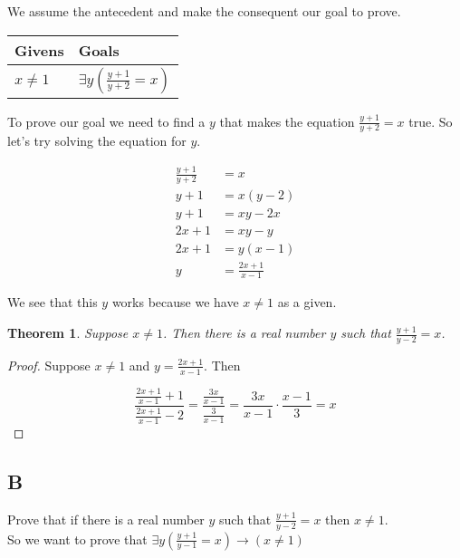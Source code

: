 \documentclass{article}
\newcommand{\n}{ \noindent }
\newtheorem*{theorem}{Theorem}  %
\begin{document}
We assume the antecedent and make the consequent our goal to prove. \\

\begin{table}[h]
\begin{tabular}{ll}
\hline
Givens & Goals   \\ \hline
$x \neq 1$ & $\exists y \left( \tfrac{y+1}{y+2} = x \right)$   \\ \hline
\end{tabular}
\end{table}

\n To prove our goal we need to find  a $y$ that makes the equation $ \tfrac{y+1}{y+2} = x $ true. So let's try solving the equation for $y$.

\begin{align*}
\frac{y+1}{y+2} &= x \\
y+1 &= x(y-2) \\
y+1 &= xy - 2x \\
2x+1 &= xy-y \\
2x+1 &= y(x-1) \\
y &= \frac{2x+1}{x-1}
\end{align*}

We see that this $y$ works because we have $x \neq 1$ as a given.

\begin{theorem} Suppose $x \neq 1$. Then there is a real number $y$ such that $\tfrac{y+1}{y-2} = x$.
\end{theorem}
\begin{proof}
Suppose $x \neq 1$ and $y = \tfrac{2x+1}{x-1}$. Then

\begin{equation*}
\frac{ \frac{2x+1}{x-1} +1 }{ \frac{2x+1}{x-1} -2} = \frac{ \frac{3x}{x-1} } { \frac{3}{x-1} } = \frac{3x}{x-1} \cdot \frac{x-1}{3} = x
\end{equation*}
\end{proof}

\subsection*{B}

\n Prove that if there is a real number $y$ such that $\tfrac{y+1}{y-2} = x$ then $x \neq 1$. \\

\n So we want to prove that
$\exists y \left(\frac{y+1}{y-1} = x \right) \rightarrow (x \neq 1)$ \\
\end{document}

